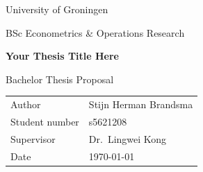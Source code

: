 

\newcommand{\thesistitle}{Your Thesis Title Here}
\newcommand{\thesisauthor}{Stijn Herman Brandsma}
\newcommand{\studentnumber}{s5621208}
\newcommand{\supervisor}{Dr.\ Lingwei Kong}
\newcommand{\programme}{BSc Econometrics \& Operations Research}
\newcommand{\institution}{University of Groningen}
\newcommand{\submissiondate}{\today}



\begin{titlepage}
    \centering
    \vspace*{2cm}

    {\Large \institution \par}
    \vspace{0.5cm}
    {\large \programme \par}

    \vfill

    {\LARGE \bfseries \thesistitle \par}
    \vspace{1cm}
    {\large Bachelor Thesis Proposal \par}

    \vfill

    \begin{tabular}{ll}
        Author          & \thesisauthor   \\
        Student number  & \studentnumber  \\
        Supervisor      & \supervisor     \\
        Date            & \submissiondate \\
    \end{tabular}

\end{titlepage}


\tableofcontents
\clearpage

